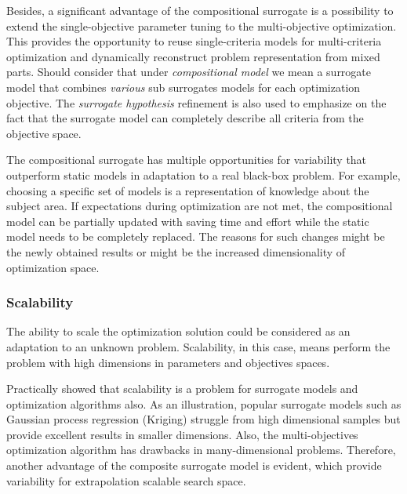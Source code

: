             Besides, a significant advantage of the compositional surrogate is a possibility to extend the single-objective parameter tuning to the multi-objective optimization. This provides the opportunity to reuse single-criteria models for multi-criteria optimization and dynamically reconstruct problem representation from mixed parts.
            Should consider that under \emph{compositional model} we mean a surrogate model that combines \emph{various} sub surrogates models for each optimization objective. The \emph{surrogate hypothesis} refinement is also used to emphasize on the fact that the surrogate model can completely describe all criteria from the objective space.


            The compositional surrogate has multiple opportunities for variability that outperform static models in adaptation to a real black-box problem. For example, choosing a specific set of models is a representation of knowledge about the subject area. If expectations during optimization are not met, the compositional model can be partially updated with saving time and effort while the static model needs to be completely replaced. The reasons for such changes might be the newly obtained results or might be the increased dimensionality of optimization space.

            \subsubsection{Scalability}
            The ability to scale the optimization solution could be considered as an adaptation to an unknown problem. Scalability, in this case, means perform the problem with high dimensions in parameters and objectives spaces.

            Practically showed that scalability is a problem for surrogate models and optimization algorithms also. As an illustration, popular surrogate models such as Gaussian process regression (Kriging) \cite{JonesSW98} struggle from high dimensional samples but provide excellent results in smaller dimensions. Also, the multi-objectives optimization algorithm has drawbacks in many-dimensional problems. Therefore, another advantage of the composite surrogate model is evident, which provide variability for extrapolation scalable search space.

